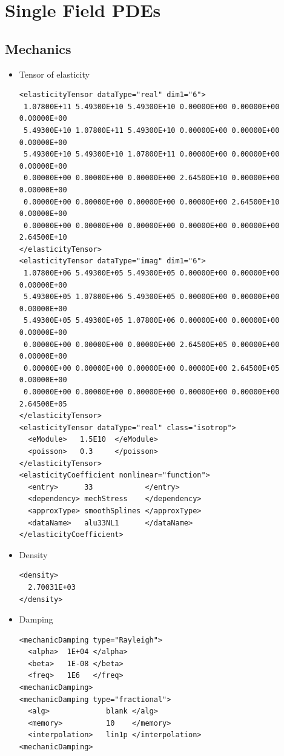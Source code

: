 \chapter{Single Field PDEs}

\section{Mechanics}

\begin{itemize}
\item Tensor of elasticity
\begin{verbatim}
<elasticityTensor dataType="real" dim1="6">
 1.07800E+11 5.49300E+10 5.49300E+10 0.00000E+00 0.00000E+00 0.00000E+00
 5.49300E+10 1.07800E+11 5.49300E+10 0.00000E+00 0.00000E+00 0.00000E+00
 5.49300E+10 5.49300E+10 1.07800E+11 0.00000E+00 0.00000E+00 0.00000E+00
 0.00000E+00 0.00000E+00 0.00000E+00 2.64500E+10 0.00000E+00 0.00000E+00
 0.00000E+00 0.00000E+00 0.00000E+00 0.00000E+00 2.64500E+10 0.00000E+00
 0.00000E+00 0.00000E+00 0.00000E+00 0.00000E+00 0.00000E+00 2.64500E+10
</elasticityTensor>
<elasticityTensor dataType="imag" dim1="6">
 1.07800E+06 5.49300E+05 5.49300E+05 0.00000E+00 0.00000E+00 0.00000E+00
 5.49300E+05 1.07800E+06 5.49300E+05 0.00000E+00 0.00000E+00 0.00000E+00
 5.49300E+05 5.49300E+05 1.07800E+06 0.00000E+00 0.00000E+00 0.00000E+00
 0.00000E+00 0.00000E+00 0.00000E+00 2.64500E+05 0.00000E+00 0.00000E+00
 0.00000E+00 0.00000E+00 0.00000E+00 0.00000E+00 2.64500E+05 0.00000E+00
 0.00000E+00 0.00000E+00 0.00000E+00 0.00000E+00 0.00000E+00 2.64500E+05
</elasticityTensor>
<elasticityTensor dataType="real" class="isotrop">
  <eModule>   1.5E10  </eModule>
  <poisson>   0.3     </poisson>
</elasticityTensor>
<elasticityCoefficient nonlinear="function">
  <entry>      33            </entry>
  <dependency> mechStress    </dependency>
  <approxType> smoothSplines </approxType>
  <dataName>   alu33NL1      </dataName>
</elasticityCoefficient>
\end{verbatim}

\item Density
\begin{verbatim}
<density>
  2.70031E+03
</density>
\end{verbatim}

\item Damping
\begin{verbatim}
<mechanicDamping type="Rayleigh">
  <alpha>  1E+04 </alpha>
  <beta>   1E-08 </beta>
  <freq>   1E6   </freq>
<mechanicDamping>
<mechanicDamping type="fractional">
  <alg>             blank </alg>
  <memory>          10    </memory>
  <interpolation>   lin1p </interpolation>
<mechanicDamping>
\end{verbatim}
\end{itemize}


